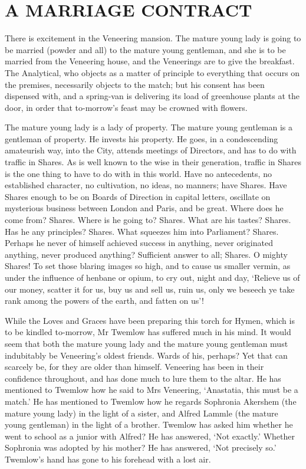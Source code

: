 
\chapter{A MARRIAGE CONTRACT}

There is excitement in the Veneering mansion. The mature young lady is
going to be married (powder and all) to the mature young gentleman, and
she is to be married from the Veneering house, and the Veneerings are to
give the breakfast. The Analytical, who objects as a matter of principle
to everything that occurs on the premises, necessarily objects to the
match; but his consent has been dispensed with, and a spring-van is
delivering its load of greenhouse plants at the door, in order that
to-morrow’s feast may be crowned with flowers.

The mature young lady is a lady of property. The mature young gentleman
is a gentleman of property. He invests his property. He goes, in
a condescending amateurish way, into the City, attends meetings of
Directors, and has to do with traffic in Shares. As is well known to the
wise in their generation, traffic in Shares is the one thing to have to
do with in this world. Have no antecedents, no established character, no
cultivation, no ideas, no manners; have Shares. Have Shares enough to
be on Boards of Direction in capital letters, oscillate on mysterious
business between London and Paris, and be great. Where does he come
from? Shares. Where is he going to? Shares. What are his tastes? Shares.
Has he any principles? Shares. What squeezes him into Parliament?
Shares. Perhaps he never of himself achieved success in anything, never
originated anything, never produced anything? Sufficient answer to all;
Shares. O mighty Shares! To set those blaring images so high, and to
cause us smaller vermin, as under the influence of henbane or opium, to
cry out, night and day, ‘Relieve us of our money, scatter it for us, buy
us and sell us, ruin us, only we beseech ye take rank among the powers
of the earth, and fatten on us’!

While the Loves and Graces have been preparing this torch for Hymen,
which is to be kindled to-morrow, Mr Twemlow has suffered much in his
mind. It would seem that both the mature young lady and the mature young
gentleman must indubitably be Veneering’s oldest friends. Wards of his,
perhaps? Yet that can scarcely be, for they are older than himself.
Veneering has been in their confidence throughout, and has done much to
lure them to the altar. He has mentioned to Twemlow how he said to
Mrs Veneering, ‘Anastatia, this must be a match.’ He has mentioned to
Twemlow how he regards Sophronia Akershem (the mature young lady) in the
light of a sister, and Alfred Lammle (the mature young gentleman) in the
light of a brother. Twemlow has asked him whether he went to school as
a junior with Alfred? He has answered, ‘Not exactly.’ Whether Sophronia
was adopted by his mother? He has answered, ‘Not precisely so.’
Twemlow’s hand has gone to his forehead with a lost air.

